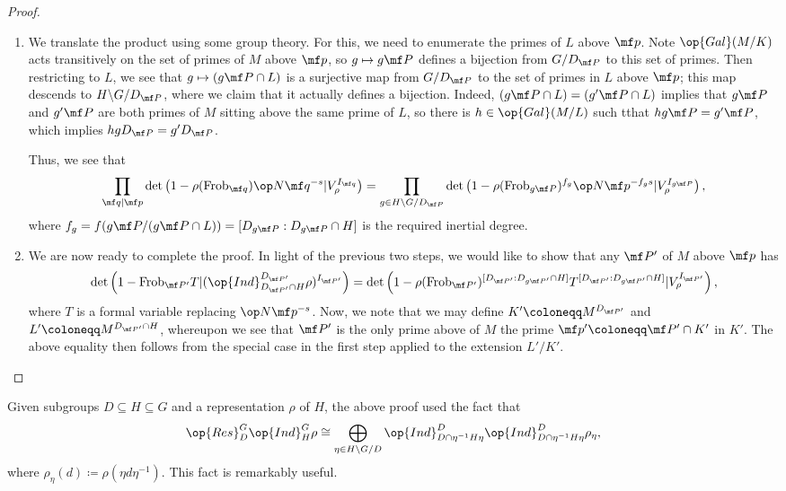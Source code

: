 \documentclass[../thesis.tex]{subfiles}
\begin{document}
\begin{proof}
\begin{enumerate}
		\item We translate the product using some group theory. For this, we need to enumerate the primes of $L$ above $\mf p$. Note $\op{Gal}(M/K)$ acts transitively on the set of primes of $M$ above $\mf p$, so $g\mapsto g\mf P$ defines a bijection from $G/D_{\mf P}$ to this set of primes. Then restricting to $L$, we see that $g\mapsto (g\mf P\cap L)$ is a surjective map from $G/D_{\mf P}$ to the set of primes in $L$ above $\mf p$; this map descends to $H\backslash G/D_{\mf P}$, where we claim that it actually defines a bijection. Indeed, $(g\mf P\cap L)=(g'\mf P\cap L)$ implies that $g\mf P$ and $g'\mf P$ are both primes of $M$ sitting above the same prime of $L$, so there is $h\in\op{Gal}(M/L)$ such tthat $hg\mf P=g'\mf P$, which implies $hgD_{\mf P}=g'D_{\mf P}$.

		Thus, we see that
		\[\prod_{\mf q\mid\mf p}\det\left(1-\rho(\mathrm{Frob}_{\mf q})\op N\mf q^{-s}\vert V_{\rho}^{I_{\mf q}}\right)=\prod_{g\in H\backslash G/D_{\mf P}}\det\left(1-\rho(\mathrm{Frob}_{g\mf P})^{f_g}\op N\mf p^{-f_gs}\vert V_{\rho}^{I_{g\mf P}}\right),\]
		where $f_g=f(g\mf P/(g\mf P\cap L))=[D_{g\mf P}:D_{g\mf P}\cap H]$ is the required inertial degree.

		\item We are now ready to complete the proof. In light of the previous two steps, we would like to show that any $\mf P'$ of $M$ above $\mf p$ has
		\[\det\left(1-\mathrm{Frob}_{\mf P'}T\vert (\op{Ind}^{D_{\mf P'}}_{D_{\mf P'}\cap H}\rho)^{I_{\mf P'}}\right)=\det\left(1-\rho(\mathrm{Frob}_{\mf P'})^{[D_{\mf P'}:D_{g\mf P'}\cap H]}T^{[D_{\mf P'}:D_{g\mf P'}\cap H]}\vert V_{\rho}^{I_{\mf P'}}\right),\]
		where $T$ is a formal variable replacing $\op N\mf p^{-s}$.
		Now, we note that we may define $K'\coloneqq M^{D_{\mf P'}}$ and $L'\coloneqq M^{D_{\mf P'}\cap H}$, whereupon we see that $\mf P'$ is the only prime above of $M$ the prime $\mf p'\coloneqq\mf P'\cap K'$ in $K'$. The above equality then follows from the special case in the first step applied to the extension $L'/K'$.
		\qedhere
	\end{enumerate}
\end{proof}
\begin{remark} \label{rem:mackey}
	Given subgroups $D\subseteq H\subseteq G$ and a representation $\rho$ of $H$, the above proof used the fact that
	\[\op{Res}^G_D\op{Ind}^G_H\rho\cong\bigoplus_{\eta\in H\backslash G/D}\op{Ind}^D_{D\cap \eta^{-1}H\eta}\op{Ind}^D_{D\cap \eta^{-1}H\eta}\rho_\eta,\]
	where $\rho_\eta(d)\coloneqq\rho(\eta d\eta^{-1})$. This fact is remarkably useful.
\end{remark}
\end{document}
